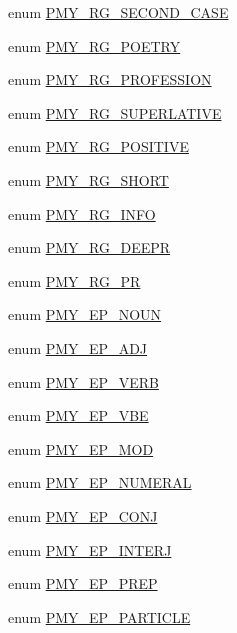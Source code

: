 \begin{DoxyCompactItemize}
\item 
enum \hyperlink{gramtab__consts_8php_ac7d20376797d8954d0d99561c2c1775c}{PMY\_\-RG\_\-SECOND\_\-CASE} 
\item 
enum \hyperlink{gramtab__consts_8php_ad2ffaf146172e156d7df0ca3f9307745}{PMY\_\-RG\_\-POETRY} 
\item 
enum \hyperlink{gramtab__consts_8php_a60b7b6c2e85d0e3287a30e3a26fb5610}{PMY\_\-RG\_\-PROFESSION} 
\item 
enum \hyperlink{gramtab__consts_8php_aa22ee487942694787bf6a63a613ce95f}{PMY\_\-RG\_\-SUPERLATIVE} 
\item 
enum \hyperlink{gramtab__consts_8php_a794db223f0e04066270ff5f912569b5b}{PMY\_\-RG\_\-POSITIVE} 
\item 
enum \hyperlink{gramtab__consts_8php_a3ade9f281fab07fd95bbca0ffb407f16}{PMY\_\-RG\_\-SHORT} 
\item 
enum \hyperlink{gramtab__consts_8php_a7f4d8454e091f744a59c0dc0d3b50077}{PMY\_\-RG\_\-INFO} 
\item 
enum \hyperlink{gramtab__consts_8php_a746c1f93d523829bcf87caddb2b40c7a}{PMY\_\-RG\_\-DEEPR} 
\item 
enum \hyperlink{gramtab__consts_8php_acc0c65f5947131a6e7d5ac212c41a914}{PMY\_\-RG\_\-PR} 
\item 
enum \hyperlink{gramtab__consts_8php_aa475f3936a15232fdc5d8efa36f19fbd}{PMY\_\-EP\_\-NOUN} 
\item 
enum \hyperlink{gramtab__consts_8php_ab4d7d4daa951a89605bd7f9ac2cfe614}{PMY\_\-EP\_\-ADJ} 
\item 
enum \hyperlink{gramtab__consts_8php_a506666162e4082937bf1336a439d60b1}{PMY\_\-EP\_\-VERB} 
\item 
enum \hyperlink{gramtab__consts_8php_aeeeeaa750e2953d3f480b1e771e247be}{PMY\_\-EP\_\-VBE} 
\item 
enum \hyperlink{gramtab__consts_8php_a1f9ca9e1ec4107112a1ce0b797b39be6}{PMY\_\-EP\_\-MOD} 
\item 
enum \hyperlink{gramtab__consts_8php_a7c7d790e17f1b322badfddbec9a7d953}{PMY\_\-EP\_\-NUMERAL} 
\item 
enum \hyperlink{gramtab__consts_8php_ab7fae4c97630707c3b309d386a32ea2c}{PMY\_\-EP\_\-CONJ} 
\item 
enum \hyperlink{gramtab__consts_8php_a27a21b634bf4c2a32606fda7acfc0da2}{PMY\_\-EP\_\-INTERJ} 
\item 
enum \hyperlink{gramtab__consts_8php_adc3b3962213ea58c6f6a4f881d9152ca}{PMY\_\-EP\_\-PREP} 
\item 
enum \hyperlink{gramtab__consts_8php_a32030d379c8e6d6c3b8b02d905664abc}{PMY\_\-EP\_\-PARTICLE} 

\end{DoxyCompactItemize}

